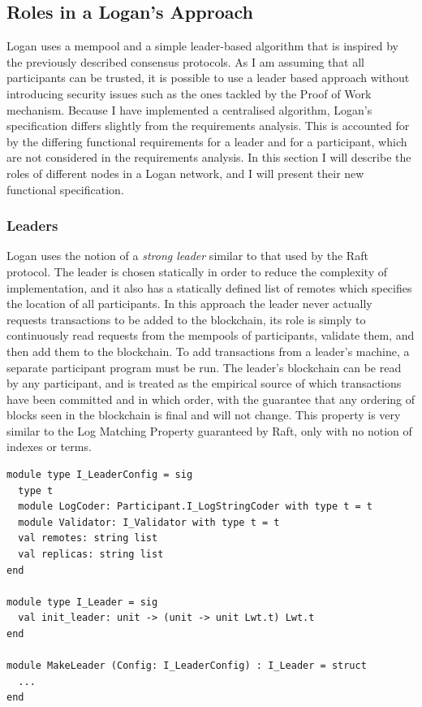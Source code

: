 \documentclass[12pt,a4paper,twoside,openright]{report}
\begin{document}
	\subsection{Roles in a Logan's Approach}
	Logan uses a mempool and a simple leader-based algorithm that is inspired by the previously described consensus protocols.
	As I am assuming that all participants can be trusted, it is possible to use a leader based approach without introducing security issues such as the ones tackled by the Proof of Work mechanism. 
	Because I have implemented a centralised algorithm, Logan's specification differs slightly from the requirements analysis.
	This is accounted for by the differing functional requirements for a leader and for a participant, which are not considered in the requirements analysis.
	In this section I will describe the roles of different nodes in a Logan network, and I will present their new functional specification.
	
	\subsubsection*{Leaders}
	Logan uses the notion of a \textit{strong leader} similar to that used by the Raft protocol. 
	The leader is chosen statically in order to reduce the complexity of implementation, and it also has a statically defined list of remotes which specifies the location of all participants.
	In this approach the leader never actually requests transactions to be added to the blockchain, its role is simply to continuously read requests from the mempools of participants, validate them, and then add them to the blockchain.
	To add transactions from a leader's machine, a separate participant program must be run.
	The leader's blockchain can be read by any participant, and is treated as the empirical source of which transactions have been committed and in which order, with the guarantee that any ordering of blocks seen in the blockchain is final and will not change.
	This property is very similar to the Log Matching Property guaranteed by Raft, only with no notion of indexes or terms.\\

	\begin{lstlisting}[caption={Leader Specification},label={lst:leaderspec}]
module type I_LeaderConfig = sig
  type t
  module LogCoder: Participant.I_LogStringCoder with type t = t   
  module Validator: I_Validator with type t = t 
  val remotes: string list
  val replicas: string list
end

module type I_Leader = sig
  val init_leader: unit -> (unit -> unit Lwt.t) Lwt.t
end

module MakeLeader (Config: I_LeaderConfig) : I_Leader = struct
  ...
end
	\end{lstlisting}
\end{document}
